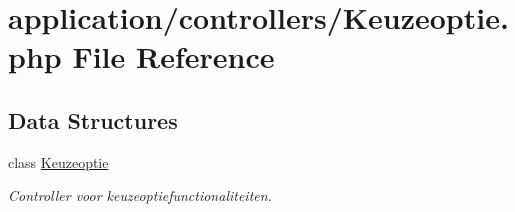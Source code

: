 \hypertarget{_keuzeoptie_8php}{}\section{application/controllers/\+Keuzeoptie.php File Reference}
\label{_keuzeoptie_8php}
\subsection*{Data Structures}
\begin{DoxyCompactItemize}
\item 
class \mbox{\hyperlink{class_keuzeoptie}{Keuzeoptie}}
\begin{DoxyCompactList}\small\item\em Controller voor keuzeoptiefunctionaliteiten. \end{DoxyCompactList}\end{DoxyCompactItemize}
